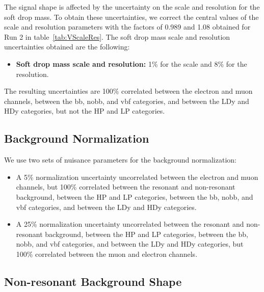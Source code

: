 The \MJ signal shape is affected by the uncertainty on the scale and resolution for the soft drop mass.
To obtain these uncertainties, we correct the central values of the \MJ scale and resolution parameters with the factors of 0.989 and 1.08 obtained for Run 2 in table~\ref{tab:VScaleRes}.
The soft drop mass scale and resolution uncertainties obtained are the following:
\begin{itemize}
  \item {\bfseries Soft drop mass scale and resolution:} 1\% for the scale and 8\% for the resolution.
\end{itemize}
The resulting uncertainties are 100\% correlated between the electron and muon channels, between the bb, nobb, and vbf categories, and between the LDy and HDy categories, but not the HP and LP categories.

\subsection{Background Normalization}

We use two sets of nuisance parameters for the background normalization:
\begin{itemize}
  \item A 5\% normalization uncertainty uncorrelated between the electron and muon channels, but 100\% correlated between the resonant and non-resonant background, between the HP and LP categories, between the bb, nobb, and vbf categories, and between the LDy and HDy categories.
  \item A 25\% normalization uncertainty uncorrelated between the resonant and non-resonant background, between the HP and LP categories, between the bb, nobb, and vbf categories, and between the LDy and HDy categories, but 100\% correlated between the muon and electron channels.
\end{itemize}

\subsection{Non-resonant Background Shape}

